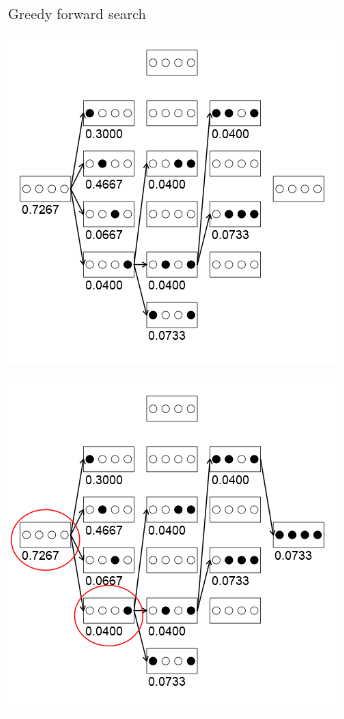 \documentclass[11pt,compress,t,notes=noshow, xcolor=table]{beamer}
\begin{document}
\begin{vbframe}{Greedy forward search}
    \framebreak

    \begin{center}
    \includegraphics[width = 0.65\textwidth]{figure_man/wrapperanim5.png}
    \end{center}

    \framebreak

    \begin{center}
    \includegraphics[width = 0.65\textwidth]{figure_man/wrapperanim6.png}
    \end{center}
    
  \end{vbframe}
\end{document}
